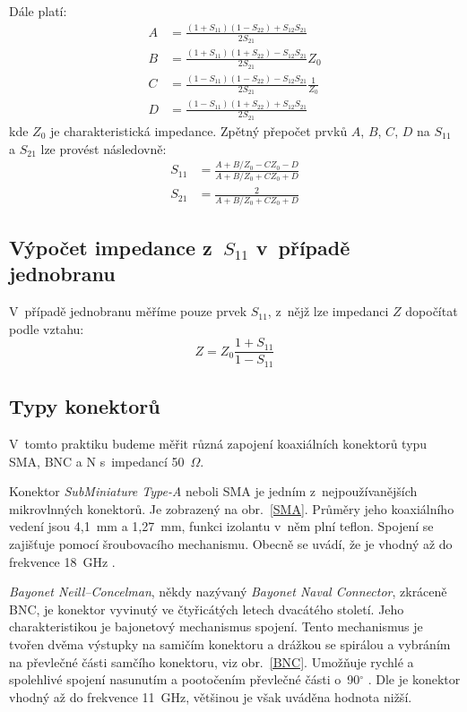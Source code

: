 \documentclass{protokol}
\newcommand\sparam{S}
\newcommand\impedance{Z}
\begin{document}
Dále platí:
\begin{align}
	\label{eq:tmatrix-elema}
	A &= \frac{(1+S_{11})(1-S_{22})+S_{12}S_{21}}{2S_{21}} \\
	\label{eq:tmatrix-elemb}
	B &= \frac{(1+S_{11})(1+S_{22})-S_{12}S_{21}}{2S_{21}} Z_0 \\
	\label{eq:tmatrix-elemc}
	C &= \frac{(1-S_{11})(1-S_{22})-S_{12}S_{21}}{2S_{21}} \frac{1}{Z_0} \\
	\label{eq:tmatrix-elemd}
	D &= \frac{(1-S_{11})(1+S_{22})+S_{12}S_{21}}{2S_{21}}
\end{align}
kde $\impedance_{0}$ je charakteristická impedance.
Zpětný přepočet prvků $A$, $B$, $C$, $D$ na $S_{11}$ a $S_{21}$
lze provést následovně:
\begin{align}
	\label{eq:s11}
	S_{11} &= \frac{A+B/Z_0-CZ_0-D}{A+B/Z_0+CZ_0+D} \\
	\label{eq:s21}
	S_{21} &= \frac{2}{A+B/Z_0+CZ_0+D}
\end{align}

\subsection{Výpočet impedance
	z~\texorpdfstring{$\sparam_{11}$}{\sparam\textoneinferior\textoneinferior}
	v~případě jednobranu}
V~případě jednobranu měříme pouze prvek $\sparam_{11}$,
z~nějž lze impedanci $\impedance$ dopočítat podle vztahu:
\begin{equation}
	\impedance = \impedance_{0}\frac{1+\sparam_{11}}{1-\sparam_{11}}
	\label{eq:Z}
\end{equation}


\subsection{Typy konektorů}
V~tomto praktiku budeme měřit různá zapojení koaxiálních konektorů typu
SMA, BNC a N s~impedancí 50~$\Omega$.

Konektor \emph{SubMiniature Type-A} neboli SMA je jedním z~nejpoužívanějších
mikrovlnných konektorů. Je zobrazený na obr.~\ref{SMA}.
Průměry jeho koaxiálního vedení jsou 4,1~mm a 1,27~mm,
funkci izolantu v~něm plní teflon.
Spojení se zajišťuje pomocí šroubovacího mechanismu.
Obecně se uvádí, že je vhodný až do frekvence 18~GHz \cite{rfhandbook}.

\emph{Bayonet Neill--Concelman}, někdy nazývaný \emph{Bayonet Naval Connector},
zkráceně BNC, je konektor vyvinutý ve čtyřicátých letech dvacátého století.
Jeho charakteristikou je bajonetový mechanismus spojení.
Tento mechanismus je tvořen dvěma výstupky na samičím konektoru
a drážkou se spirálou a vybráním na převlečné části samčího konektoru,
viz obr.~\ref{BNC}.
Umožňuje rychlé a spolehlivé spojení nasunutím a pootočením převlečné
části o~90$^{\circ}$ \cite{czwiki}.
Dle \cite{rfhandbook} je konektor vhodný až do frekvence 11~GHz,
většinou je však uváděna hodnota nižší.
\end{document}
